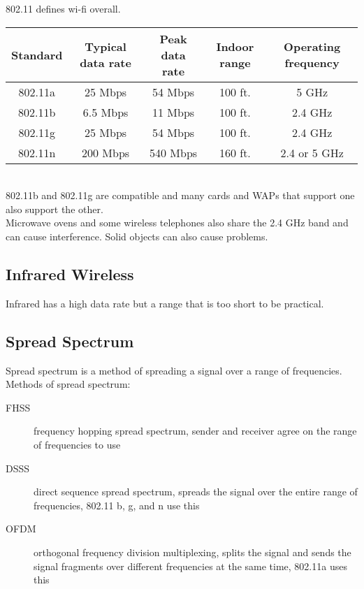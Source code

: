 802.11 defines wi-fi overall.\\

\begin{tabular}{ | c | c | c | c | c | }
\hline
Standard & Typical data rate & Peak data rate & Indoor range & Operating frequency\\ \hline
802.11a & 25 Mbps  & 54 Mbps  & 100 ft. & 5 GHz \\ \hline
802.11b & 6.5 Mbps & 11 Mbps  & 100 ft. & 2.4 GHz \\ \hline
802.11g & 25 Mbps  & 54 Mbps  & 100 ft. & 2.4 GHz \\ \hline
802.11n & 200 Mbps & 540 Mbps & 160 ft. & 2.4 or 5 GHz \\ \hline
\end{tabular}\\

802.11b and 802.11g are compatible and many cards and WAPs that support one
also support the other.\\

Microwave ovens and some wireless telephones also share the 2.4 GHz band
and can cause interference. Solid objects can also cause problems.

\subsection{Infrared Wireless}

Infrared has a high data rate but a range that is too short to be practical.

\subsection{Spread Spectrum}

Spread spectrum is a method of spreading a signal over a range of frequencies.\\

Methods of spread spectrum:

\begin{description}

\item[FHSS]
frequency hopping spread spectrum, sender and receiver agree on the range of
frequencies to use

\item[DSSS]
direct sequence spread spectrum, spreads the signal over the entire range of
frequencies, 802.11 b, g, and n use this

\item[OFDM]
orthogonal frequency division multiplexing, splits the signal and sends the
signal fragments over different frequencies at the same time, 802.11a uses
this

\end{description}

